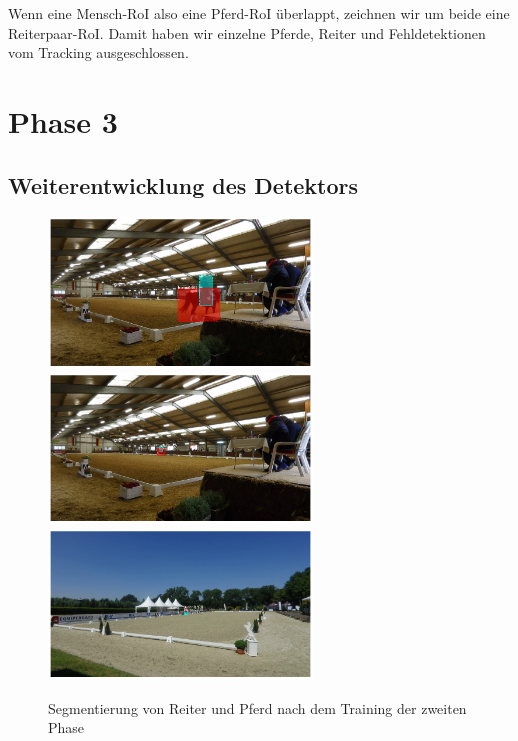 Wenn eine Mensch-RoI also eine Pferd-RoI überlappt, zeichnen wir um beide eine Reiterpaar-RoI. Damit haben wir einzelne Pferde, Reiter und Fehldetektionen vom Tracking ausgeschlossen.


\section{Phase 3}
\subsection*{Weiterentwicklung des Detektors}

\begin{figure}
\centering
\includegraphics[height=4cm,trim={6cm 0 6cm 0},clip]{./img/IndoorMask6.png}
\includegraphics[height=4cm,trim={6cm 0 6cm 0},clip]{./img/IndoorMask3.png}
\includegraphics[height=4cm,trim={6cm 0 6cm 0},clip]{./img/OutdoorMask2.png}
\caption{Segmentierung von Reiter und Pferd nach dem Training der zweiten Phase}
\label{fig:SegmentierungPhase3}
\end{figure}

